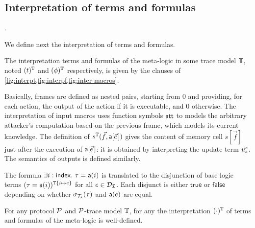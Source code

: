 \subsection{Interpretation of terms and formulas}

\newcommand{\interp}[1]{(#1)}

.

We define next the interpretation of terms and formulas. %

\begin{definition}
  The interpretation %
  terms and formulas of the meta-logic in
  some trace model $\mathbb{T}$, noted $\interp{t}^\TM$ and $\interp{\phi}^\TM$
  respectively, is given by the clauses of \cref{fig:interpt,fig:interpf,fig:inter-macros}.
\end{definition}

Basically, frames are defined as nested pairs, starting from $0$ and
providing, for each action, the output of the action if it is executable,
and $0$ otherwise. The interpretation of input macros uses function symbols $\mathsf{att}$ to models the arbitrary attacker's computation based on the previous frame, which models its current knowledge. The definition of $s^\TM(\vec{f},\sfa[\pvec{e}])$ gives the content of memory cell $s[\vec{f}]$ just after the execution of $\sfa[\pvec{e}]$:
it is obtained by interpreting the update term $u_{\textsf{a}}^{s}$. The semantics of outputs is defined similarly. 



\begin{example}
  The formula
  $\exists i:\textsf{index}.~ \tau = \textsf{a}(i)$
  is translated to the disjunction of base logic terms
  $\interp{\tau = \sfa(i)}^{\TM\{i\mapsto e\}}$ for all $e \in \mathcal{D}_{\mathcal{I}}$.
  Each disjunct is either $\mathsf{true}$ or $\mathsf{false}$ depending on
  whether $\sigma_{\mathcal{T}_s}(\tau)$ and $\textsf{a}(e)$ are equal.
\end{example}

\begin{proposition}
  For any protocol $\mathcal{P}$ and $\mathcal{P}$-trace model $\mathbb{T}$, for any the interpretation $(\cdot)^{\mathbb{T}}$ of terms and formulas of the meta-logic is well-defined.
\end{proposition}

